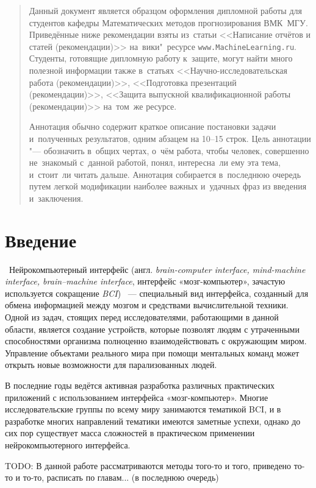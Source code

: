 \documentclass[12pt,fleqn]{article}
\begin{document}
\newpage
\renewcommand{\contentsname}{Содержание}
\tableofcontents

\newpage
\begin{abstract}
    Данный документ является образцом оформления дипломной работы для студентов кафедры 
    Математических методов прогнозирования ВМК~МГУ. 
    Приведённые ниже рекомендации взяты из~статьи
    <<Написание отчётов и статей (рекомендации)>>
    на~вики"~ресурсе \texttt{www.MachineLearning.ru}.
    Студенты, готовящие дипломную работу к~защите, 
    могут найти много полезной информации также в~статьях 
    <<Научно-исследовательская работа (рекомендации)>>,
    <<Подготовка презентаций (рекомендации)>>,
    <<Защита выпускной квалификационной работы (рекомендации)>>
    на~том~же ресурсе. 

    Аннотация обычно содержит 
    краткое описание постановки задачи и~полученных результатов,
    одним абзацем на 10--15 строк.
    Цель аннотации "--- обозначить в~общих чертах, о~чём работа,
    чтобы человек, совершенно не~знакомый с~данной работой,
    понял, интересна~ли ему эта тема, и~стоит~ли читать дальше.
    Аннотация собирается в~последнюю очередь
    путем легкой модификации наиболее важных и~удачных фраз из введения и~заключения.
\end{abstract}

\newpage
\section*{Введение}
	\quad\,\,\,Нейрокомпьютерный интерфейс (англ. {\it brain-computer interface, mind-machine interface, brain–machine interface}, интерфейс «мозг-компьютер», зачастую используется сокращение {\it BCI}) ~--- специальный вид интерфейса, созданный для обмена информацией между мозгом и средствами вычислительной техники. Одной из задач, стоящих перед исследователями, работающими в данной области, является создание устройств, которые позволят людям с утраченными способностями организма полноценно взаимодействовать с окружающим миром. Управление объектами реального мира при помощи ментальных команд может открыть новые возможности для парализованных людей. 
	\par В последние годы ведётся активная разработка различных практических приложений с использованием интерфейса «мозг-компьютер». Многие исследовательские группы по всему миру занимаются тематикой BCI, и в разработке многих направлений тематики имеются заметные успехи, однако до сих пор существует масса сложностей в практическом применении нейрокомпьютерного интерфейса.
	\par TODO: В данной работе рассматриваются методы того-то и того, приведено то-то и то-то, расписать по главам... (в последнюю очередь)
\end{document}
